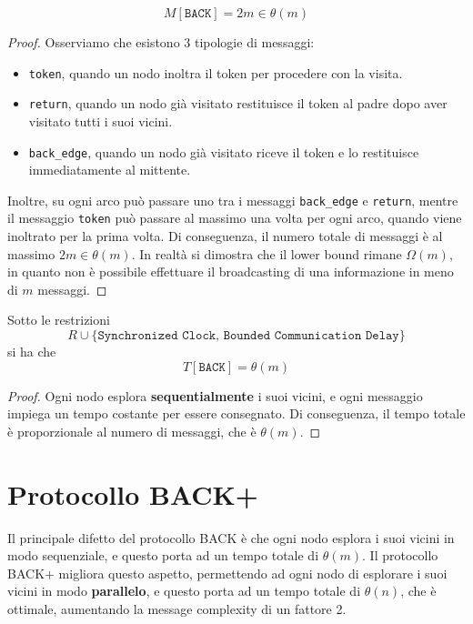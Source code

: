 \begin{teorema}
    \[
        M[\texttt{BACK}] = 2m \in \theta(m)
    \]
    \begin{proof}
        Osserviamo che esistono 3 tipologie di messaggi: 
        \begin{itemize}
            \item \texttt{token}, quando un nodo inoltra il token per procedere con la visita.
            \item \texttt{return}, quando un nodo già visitato restituisce il token al padre dopo aver visitato tutti i suoi vicini.
            \item \texttt{back\_edge}, quando un nodo già visitato riceve il token e lo restituisce immediatamente al mittente.
        \end{itemize}
        Inoltre, su ogni arco può passare uno tra i messaggi \texttt{back\_edge} e \texttt{return}, mentre il messaggio \texttt{token} può passare al massimo una volta per ogni arco, quando viene inoltrato per la prima volta. Di conseguenza, il numero totale di messaggi è al massimo $2m \in \theta(m)$. In realtà si dimostra che il lower bound rimane $\Omega(m)$, in quanto non è possibile effettuare il broadcasting di una informazione in meno di $m$ messaggi.
    \end{proof}
\end{teorema}

\begin{teorema}
    Sotto le restrizioni 
    \[
    R \cup \{\texttt{Synchronized Clock, Bounded Communication Delay}\}
    \]
    si ha che
    \[
        T[\texttt{BACK}] = \theta(m)
    \]
    \begin{proof}
        Ogni nodo esplora \textbf{sequentialmente} i suoi vicini, e ogni messaggio impiega un tempo costante per essere consegnato. Di conseguenza, il tempo totale è proporzionale al numero di messaggi, che è $\theta(m)$.
    \end{proof}
\end{teorema}
    
\section{Protocollo BACK+}

Il principale difetto del protocollo BACK è che ogni nodo esplora i suoi vicini in modo sequenziale, e questo porta ad un tempo totale di $\theta(m)$. Il protocollo BACK+ migliora questo aspetto, permettendo ad ogni nodo di esplorare i suoi vicini in modo \textbf{parallelo}, e questo porta ad un tempo totale di $\theta(n)$, che è ottimale, aumentando la message complexity di un fattore 2.

